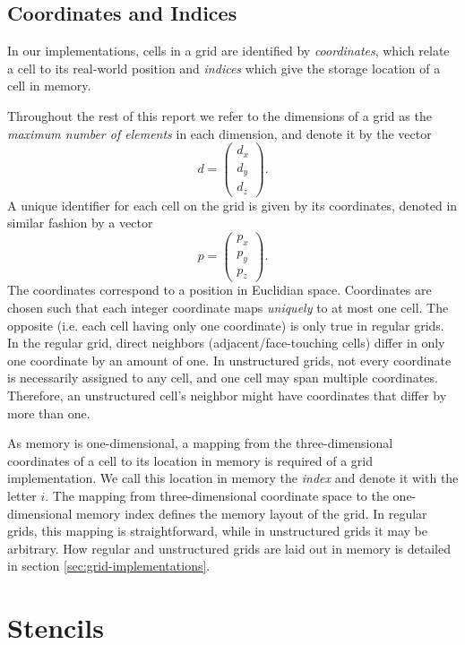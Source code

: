 \subsection{Coordinates and Indices}

In our implementations, cells in a grid are identified by \emph{coordinates}, which relate a cell to its real-world position and \emph{indices} which give the storage location of a cell in memory. 

Throughout the rest of this report we refer to the dimensions of a grid as the \emph{maximum number of elements} in each dimension, and denote it by the vector
$$d = \begin{pmatrix}d_x \\ d_y \\ d_z\end{pmatrix}.$$
A unique identifier for each cell on the grid is given by its coordinates, denoted in similar fashion by a vector
$$p = \begin{pmatrix}p_x \\ p_y \\ p_z\end{pmatrix}.$$
The coordinates correspond to a position in Euclidian space. Coordinates are chosen such that each integer coordinate maps \emph{uniquely} to at most one cell. The opposite (i.e. each cell having only one coordinate) is only true in regular grids. In the regular grid, direct neighbors (adjacent/face-touching cells) differ in only one coordinate by an amount of one. In unstructured grids, not every coordinate is necessarily assigned to any cell, and one cell may span multiple coordinates. Therefore, an unstructured cell's neighbor might have coordinates that differ by more than one.

As memory is one-dimensional, a mapping from the three-dimensional coordinates of a cell to its location in memory is required of a grid implementation. We call this location in memory the \emph{index} and denote it with the letter $i$. The mapping from three-dimensional coordinate space to the one-dimensional memory index defines the memory layout of the grid. In regular grids, this mapping is straightforward, while in unstructured grids it may be arbitrary. How regular and unstructured grids are laid out in memory is detailed in section \ref{sec:grid-implementations}.

\section{Stencils}                                    \label{sec:stencils}

